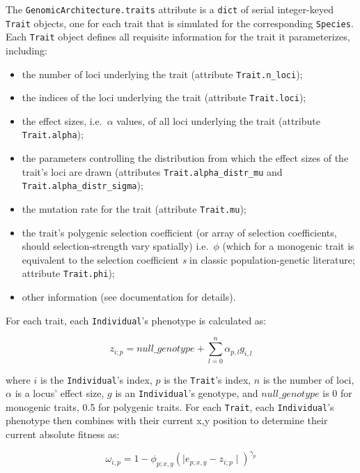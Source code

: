 ﻿\documentclass{article}
\begin{document}
The \texttt{GenomicArchitecture.traits} attribute is a \texttt{dict} of serial
integer-keyed \texttt{Trait} objects, one for each trait that is simulated for the
corresponding \texttt{Species}. Each \texttt{Trait} object defines all requisite
information for the trait it parameterizes, including:
\begin{itemize}
        \item the number of loci underlying the trait (attribute \texttt{Trait.n\_loci});
        \item the indices of the loci underlying the trait (attribute \texttt{Trait.loci});
        \item the effect sizes, i.e.\ $\alpha$ values, of all loci underlying the trait (attribute \texttt{Trait.alpha});
        \item the parameters controlling the distribution from which the effect sizes of the trait's loci are drawn (attributes \texttt{Trait.alpha\_distr\_mu} and \texttt{Trait.alpha\_distr\_sigma});
        \item the mutation rate for the trait (attribute \texttt{Trait.mu});
        \item the trait's polygenic selection coefficient (or array of selection coefficients, should selection-strength vary spatially) i.e.\ $\phi$ (which for a monogenic trait is equivalent to the selection coefficient \emph{s} in classic population-genetic literature; attribute \texttt{Trait.phi});
        \item other information (see documentation for details).
\end{itemize}

For each trait, each \texttt{Individual}'s phenotype is calculated as:

\begin{equation}
z_{i;p} = null\_genotype + \sum_{l = 0}^{n} \alpha_{p,l} g_{i,l}
\end{equation}

where $i$ is the \texttt{Individual}'s index, $p$ is the \texttt{Trait}'s index,
$n$ is the number of loci, $\alpha$ is a locus' effect size, $g$ is an
\texttt{Individual}'s genotype, and $null\_genotype$ is 0 for monogenic traits,
0.5 for polygenic traits. For each \texttt{Trait}, each \texttt{Individual}'s
phenotype then combines with their current x,y position to determine their
current absolute fitness as:

\begin{equation}
\omega_{i,p}= 1 - \phi_{p;x,y} (\mid e_{p;x,y} - z_{i;p} \mid)^{\gamma_{p}}
\end{equation}
\end{document}
